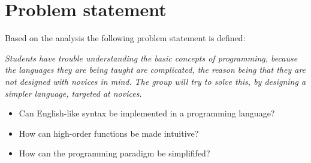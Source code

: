 \newpage
\section{Problem statement}
Based on the analysis the following problem statement is defined:
\begin{center}
	\textit{Students have trouble understanding the basic concepts of programming, because the languages they are being taught are complicated, the reason being that they are not designed with novices in mind.}
	\textit{The group will try to solve this, by designing a simpler language, targeted at novices.}

\begin{itemize}
	\item Can English-like syntax be implemented in a programming language?
	\item How can high-order functions be made intuitive?
	\item How can the programming paradigm be simplififed?
\end{itemize}
\end{center}
